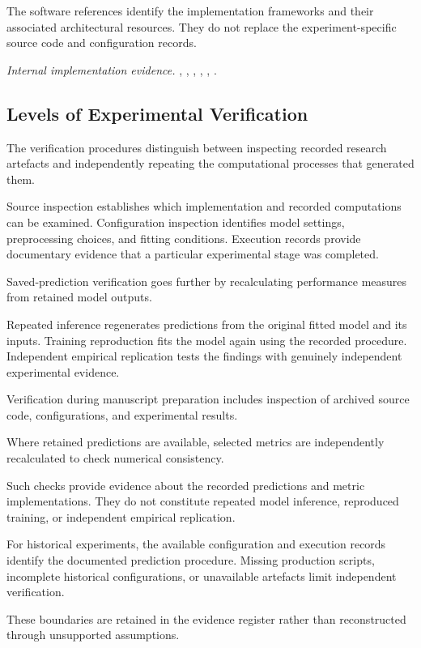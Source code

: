 The software references identify the implementation frameworks and their associated architectural resources. They do not replace the experiment-specific source code and configuration records.

\noindent\textit{Internal implementation evidence.} , , , , , .

\subsection{Levels of Experimental Verification}

The verification procedures distinguish between inspecting recorded research artefacts and independently repeating the computational processes that generated them.

Source inspection establishes which implementation and recorded computations can be examined. Configuration inspection identifies model settings, preprocessing choices, and fitting conditions. Execution records provide documentary evidence that a particular experimental stage was completed.

Saved-prediction verification goes further by recalculating performance measures from retained model outputs.

Repeated inference regenerates predictions from the original fitted model and its inputs. Training reproduction fits the model again using the recorded procedure. Independent empirical replication tests the findings with genuinely independent experimental evidence.

Verification during manuscript preparation includes inspection of archived source code, configurations, and experimental results.

Where retained predictions are available, selected metrics are independently recalculated to check numerical consistency.

Such checks provide evidence about the recorded predictions and metric implementations. They do not constitute repeated model inference, reproduced training, or independent empirical replication.

For historical experiments, the available configuration and execution records identify the documented prediction procedure. Missing production scripts, incomplete historical configurations, or unavailable artefacts limit independent verification.

These boundaries are retained in the evidence register rather than reconstructed through unsupported assumptions.

